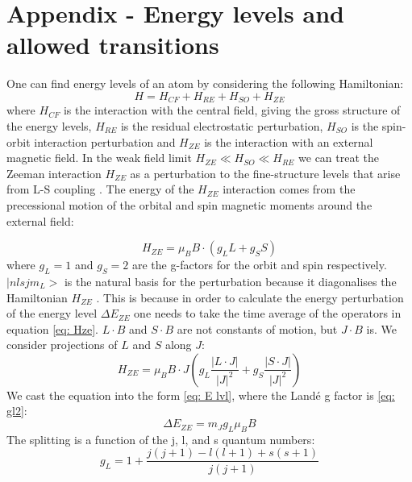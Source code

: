 \documentclass[11pt]{article}
\begin{document}



\newpage

\appendix
\section{Appendix - Energy levels and allowed transitions} \label{sec: theory derivation}
One can find energy levels of an atom by considering the following Hamiltonian: 
\begin{equation}
    H = H_{CF} + H_{RE} + H_{SO} + H_{ZE} \label{eq: atomic ham}
\end{equation}
where $H_{CF}$ is the interaction with the central field, giving the gross structure of the energy levels, $H_{RE}$ is the residual electrostatic perturbation, $H_{SO}$ is the spin-orbit interaction perturbation and $H_{ZE}$ is the interaction with an external magnetic field. In the weak field limit $H_{ZE} \ll H_{SO} \ll H_{RE}$ we can treat the Zeeman interaction $H_{ZE}$ as a perturbation to the fine-structure levels that arise from L-S coupling \cite{Binney_Skinner_2015}. The energy of the $H_{ZE}$ interaction comes from the precessional motion of the orbital and spin magnetic moments around the external field: 

\begin{equation}
    H_{ZE} = \mu_B B \cdot (g_L L + g_S S) \label{eq: Hze}
\end{equation}
where $g_L = 1$ and $g_S = 2$ are the g-factors for the orbit and spin respectively. $|n l s j m_L >$ is the natural basis for the perturbation because it diagonalises the Hamiltonian $H_{ZE}$ \cite{foot2005atomic}. This is because in order to calculate the energy perturbation of the energy level $\Delta E_{ZE}$ one needs to take the time average of the operators in equation \eqref{eq: Hze}. $L \cdot B$ and $S \cdot B$ are not constants of motion, but $J \cdot B$ is. We consider projections of $L$ and $S$ along $J$: 
\begin{equation}
    H_{ZE} = \mu_B B \cdot J(g_L \frac{|L \cdot J|}{|J|^2} + 
    g_S \frac{|S \cdot J|}{|J|^2}) \label{eq: Hze J}
\end{equation}
We cast the equation into the form \eqref{eq: E lvl}, where the Landé g factor is \eqref{eq: gl2}: 
\begin{equation}
    \Delta E_{ZE} = m_J g_L \mu_B B \label{eq: E lvl}
\end{equation}
The splitting is a function of the j, l, and s quantum numbers: 
\begin{equation}
    g_L = 1 + \frac{j(j+1)-l(l+1) +s(s+1)}{j(j+1)} \label{eq: gl2}
\end{equation}
\end{document}
